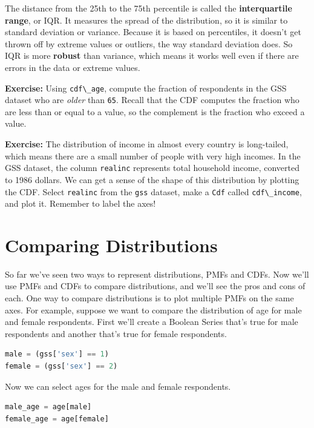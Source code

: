 The distance from the 25th to the 75th percentile is called the
\textbf{interquartile range}, or IQR. It measures the spread of the
distribution, so it is similar to standard deviation or variance.
Because it is based on percentiles, it doesn't get thrown off by extreme
values or outliers, the way standard deviation does. So IQR is more
\textbf{robust} than variance, which means it works well even if there
are errors in the data or extreme values.

\textbf{Exercise:} Using \passthrough{\lstinline!cdf\_age!}, compute the
fraction of respondents in the GSS dataset who are \emph{older} than
\passthrough{\lstinline!65!}. Recall that the CDF computes the fraction
who are less than or equal to a value, so the complement is the fraction
who exceed a value.

\textbf{Exercise:} The distribution of income in almost every country is
long-tailed, which means there are a small number of people with very
high incomes. In the GSS dataset, the column
\passthrough{\lstinline!realinc!} represents total household income,
converted to 1986 dollars. We can get a sense of the shape of this
distribution by plotting the CDF. Select
\passthrough{\lstinline!realinc!} from the \passthrough{\lstinline!gss!}
dataset, make a \passthrough{\lstinline!Cdf!} called
\passthrough{\lstinline!cdf\_income!}, and plot it. Remember to label
the axes!

\hypertarget{comparing-distributions}{%
\section{Comparing Distributions}\label{comparing-distributions}}

So far we've seen two ways to represent distributions, PMFs and CDFs.
Now we'll use PMFs and CDFs to compare distributions, and we'll see the
pros and cons of each. One way to compare distributions is to plot
multiple PMFs on the same axes. For example, suppose we want to compare
the distribution of age for male and female respondents. First we'll
create a Boolean Series that's true for male respondents and another
that's true for female respondents.

\begin{lstlisting}[language=Python,style=source]
male = (gss['sex'] == 1)
female = (gss['sex'] == 2)
\end{lstlisting}

Now we can select ages for the male and female respondents.

\begin{lstlisting}[language=Python,style=source]
male_age = age[male]
female_age = age[female]
\end{lstlisting}

